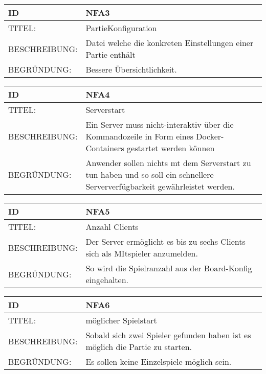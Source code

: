 \documentclass{uulm-assignment}
\begin{document}
    \begin{tabularx}{\textwidth}{|l|X |} \hline
        \textbf{ID} & \textbf{NFA3} \\
        \hline
        TITEL: &  PartieKonfiguration\\
        \hline
        BESCHREIBUNG: &  Datei welche die konkreten Einstellungen einer Partie enthält\\
        \hline
        BEGRÜNDUNG: &  Bessere Übersichtlichkeit.\\
        \hline
    \end{tabularx}

    \begin{tabularx}{\textwidth}{|l|X |} \hline
        \textbf{ID} & \textbf{NFA4} \\
        \hline
        TITEL: &  Serverstart\\
        \hline
        BESCHREIBUNG: &  Ein Server muss nicht-interaktiv über die Kommandozeile in Form eines Docker-
Containers gestartet werden können \\
        \hline
        BEGRÜNDUNG: &  Anwender sollen nichts mt dem Serverstart zu tun haben und so soll ein schnellere Serververfügbarkeit gewährleistet werden.\\
        \hline
    \end{tabularx}

    \begin{tabularx}{\textwidth}{|l|X |} \hline
        \textbf{ID} & \textbf{NFA5} \\
        \hline
        TITEL: & Anzahl Clients \\
        \hline
        BESCHREIBUNG: &  Der Server ermöglicht es bis zu sechs Clients sich als MItspieler anzumelden.\\
        \hline
        BEGRÜNDUNG: &  So wird die Spielranzahl aus der Board-Konfig eingehalten.\\
        \hline
    \end{tabularx}

    \begin{tabularx}{\textwidth}{|l|X |} \hline
        \textbf{ID} & \textbf{NFA6} \\
        \hline
        TITEL: &  möglicher Spielstart\\
        \hline
        BESCHREIBUNG: &  Sobald sich zwei Spieler gefunden haben ist es möglich die Partie zu starten.\\
        \hline
        BEGRÜNDUNG: &  Es sollen keine Einzelspiele möglich sein.\\
        \hline
    \end{tabularx}
\end{document}
